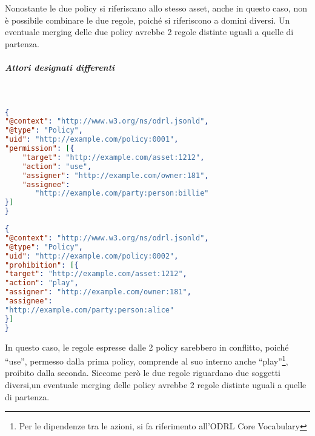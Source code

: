 \documentclass[12pt,a4paper,twoside]{book}
\begin{document}
Nonostante le due policy si riferiscano allo stesso asset, anche in questo caso, non è possibile combinare le due regole, poiché si riferiscono a domini diversi. Un eventuale merging delle due policy avrebbe 2 regole distinte uguali a quelle di partenza.\newpage
\subparagraph{Attori designati differenti}\mbox{}\\
\begin{lstlisting}[language=json,firstnumber=1,caption={La policy 0001 permette un qualsiasi utilizzo dell'asset 1212 da parte del soggetto Billie},captionpos=b]
{
"@context": "http://www.w3.org/ns/odrl.jsonld",
"@type": "Policy",
"uid": "http://example.com/policy:0001",
"permission": [{
	"target": "http://example.com/asset:1212",
	"action": "use",
	"assigner": "http://example.com/owner:181",
	"assignee": 
	   "http://example.com/party:person:billie"
}]
}
\end{lstlisting}
\begin{lstlisting}[language=json,firstnumber=1,caption={La policy 0002 proibisce la riproduzione dell'asset 1212 da parte del soggetto Alice},captionpos=b]
{
"@context": "http://www.w3.org/ns/odrl.jsonld",
"@type": "Policy",
"uid": "http://example.com/policy:0002",
"prohibition": [{
"target": "http://example.com/asset:1212",
"action": "play",
"assigner": "http://example.com/owner:181",
"assignee": 
"http://example.com/party:person:alice"
}]
}
\end{lstlisting}
In questo caso, le regole espresse dalle 2 policy sarebbero in conflitto, poiché ``use'', permesso dalla prima policy, comprende al suo interno anche ``play''\footnote{Per le dipendenze tra le azioni, si fa riferimento all'ODRL Core Vocabulary}, proibito dalla seconda. Siccome però le due regole riguardano due soggetti diversi,un eventuale merging delle policy avrebbe 2 regole distinte uguali a quelle di partenza.
\end{document}
